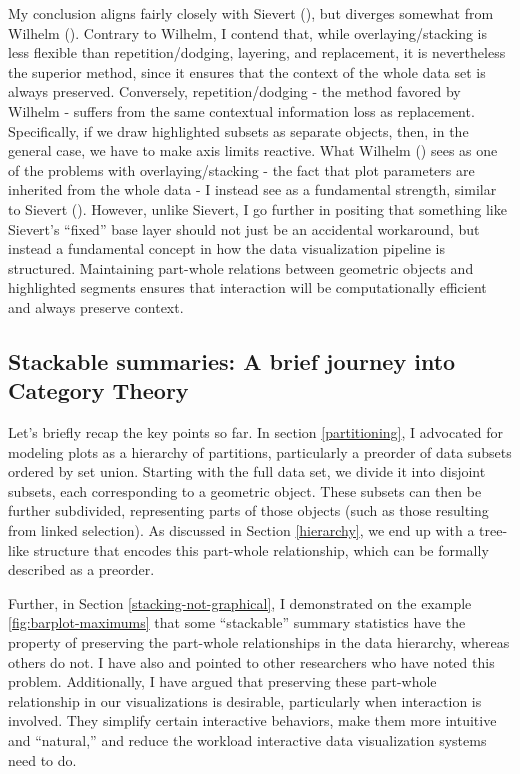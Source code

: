 \documentclass[
]{book}
\theoremstyle{definition}
\theoremstyle{definition}
\theoremstyle{definition}
\theoremstyle{definition}
\theoremstyle{remark}
\begin{document}
My conclusion aligns fairly closely with Sievert (), but diverges somewhat from Wilhelm (). Contrary to Wilhelm, I contend that, while overlaying/stacking is less flexible than repetition/dodging, layering, and replacement, it is nevertheless the superior method, since it ensures that the context of the whole data set is always preserved. Conversely, repetition/dodging - the method favored by Wilhelm - suffers from the same contextual information loss as replacement. Specifically, if we draw highlighted subsets as separate objects, then, in the general case, we have to make axis limits reactive. What Wilhelm () sees as one of the problems with overlaying/stacking - the fact that plot parameters are inherited from the whole data - I instead see as a fundamental strength, similar to Sievert (). However, unlike Sievert, I go further in positing that something like Sievert's ``fixed'' base layer should not just be an accidental workaround, but instead a fundamental concept in how the data visualization pipeline is structured. Maintaining part-whole relations between geometric objects and highlighted segments ensures that interaction will be computationally efficient and always preserve context.

\subsection{Stackable summaries: A brief journey into Category Theory}\label{stackable-summaries-a-brief-journey-into-category-theory}

Let's briefly recap the key points so far. In section \ref{partitioning}, I advocated for modeling plots as a hierarchy of partitions, particularly a preorder of data subsets ordered by set union. Starting with the full data set, we divide it into disjoint subsets, each corresponding to a geometric object. These subsets can then be further subdivided, representing parts of those objects (such as those resulting from linked selection). As discussed in Section \ref{hierarchy}, we end up with a tree-like structure that encodes this part-whole relationship, which can be formally described as a preorder.

Further, in Section \ref{stacking-not-graphical}, I demonstrated on the example \ref{fig:barplot-maximums} that some ``stackable'' summary statistics have the property of preserving the part-whole relationships in the data hierarchy, whereas others do not. I have also and pointed to other researchers who have noted this problem. Additionally, I have argued that preserving these part-whole relationship in our visualizations is desirable, particularly when interaction is involved. They simplify certain interactive behaviors, make them more intuitive and ``natural,'' and reduce the workload interactive data visualization systems need to do.
\end{document}
